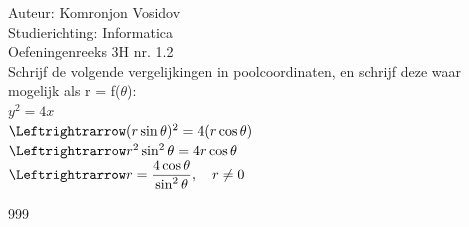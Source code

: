 \documentclass[a4paper]{article}
\begin{document}
	
	\noindent \large Auteur: Komronjon Vosidov \\
	\noindent \large Studierichting: Informatica\\
	\noindent \large Oefeningenreeks 3H nr. 1.2\\
	
	
	
	\normalsize
	Schrijf de volgende vergelijkingen in poolcoordinaten, en schrijf deze waar mogelijk als r = f($\theta$):\\
	
	$y^2 = 4x$\\
	
	$\Leftrightrarrow (r\sin\theta)^2 = 4(r\cos\theta)$\\
	
	$\Leftrightrarrow r^2\sin^2\theta = 4r\cos\theta$\\
	
	$\Leftrightrarrow r = \dfrac{4\cos\theta}{\sin^2\theta}, \quad r \neq 0$
	
	
	
	
	
	
	
	\begin{thebibliography}{999}
	\end{thebibliography}		
\end{document}
